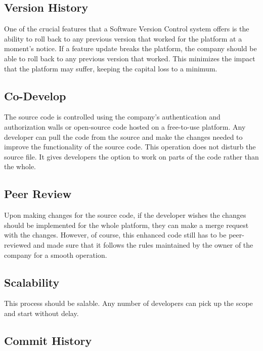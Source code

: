 \documentclass[
  man]{apa7}
\begin{document}
\hypertarget{version-history}{%
\subsection{Version History}\label{version-history}}

One of the crucial features that a Software Version Control system offers is the ability to roll back to any previous version that worked for the platform at a moment's notice. If a feature update breaks the platform, the company should be able to roll back to any previous version that worked. This minimizes the impact that the platform may suffer, keeping the capital loss to a minimum.

\hypertarget{co-develop}{%
\subsection{Co-Develop}\label{co-develop}}

The source code is controlled using the company's authentication and authorization walls or open-source code hosted on a free-to-use platform. Any developer can pull the code from the source and make the changes needed to improve the functionality of the source code. This operation does not disturb the source file. It gives developers the option to work on parts of the code rather than the whole.

\hypertarget{peer-review}{%
\subsection{Peer Review}\label{peer-review}}

Upon making changes for the source code, if the developer wishes the changes should be implemented for the whole platform, they can make a merge request with the changes. However, of course, this enhanced code still has to be peer-reviewed and made sure that it follows the rules maintained by the owner of the company for a smooth operation.

\hypertarget{scalability}{%
\subsection{Scalability}\label{scalability}}

This process should be salable. Any number of developers can pick up the scope and start without delay.

\hypertarget{commit-history}{%
\subsection{Commit History}\label{commit-history}}
\end{document}
